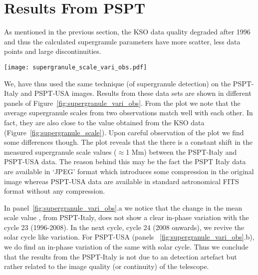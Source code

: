 \documentclass[manuscript]{aastex}	%
\begin{document}

\section{Results From PSPT} \label{sec:presult}

As mentioned in the previous section, the KSO data quality degraded after 1996 and thus the calculated supergranule parameters have more scatter, less data points and large discontinuities.

 \begin{figure*}[!htbp]
  \centering
  \texttt{[image: supergranule\_scale\_vari\_obs.pdf]}
  \vspace{-.04\textwidth} 
  \caption{Cyclic variation of mean supergranule scale for 1996-2016 from various observatories.  }
 \label{fig:supergranule_vari_obs}
\end{figure*} 

 We, have thus used the same technique (of supergranule detection) on the PSPT-Italy and PSPT-USA images. Results from these data sets are shown in different panels of Figure~\ref{fig:supergranule_vari_obs}. From the plot we note that the average supergranule scales from two observations match well with each other. In fact, they are also close to the value obtained from the KSO data (Figure~\ref{fig:supergranule_scale}). Upon careful observation of the plot we find some differences though. The plot reveals that the there is a constant shift in the measured supergranule scale values ($\approx$1 $\mathrm{Mm}$) between the PSPT-Italy and PSPT-USA data. The reason behind this may be the fact the PSPT Italy data are available in `JPEG' format which introduces some compression in the original image whereas PSPT-USA data are available in standard astronomical FITS format without any compression.

In panel~\ref{fig:supergranule_vari_obs}.a we notice that the change in the mean scale value , from PSPT-Italy, does not show a clear in-phase variation with the cycle 23 (1996-2008). In the next cycle, cycle 24 (2008 onwards), we revive the solar cycle like variation. For PSPT-USA (panels ~\ref{fig:supergranule_vari_obs}.b), we do find an in-phase variation of the same with solar cycle. Thus we conclude that the results from the PSPT-Italy is not due to an detection artefact but rather related to the image quality (or continuity) of the telescope.
\end{document}
